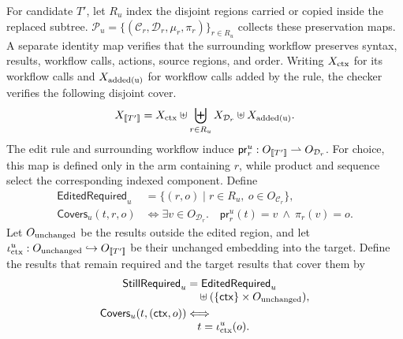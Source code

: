 For candidate \(T'\), let \(R_u\) index the disjoint regions carried or copied inside the replaced subtree.
\(\mathcal P_u=\{(\mathcal C_r,\mathcal D_r,\mu_r,\pi_r)\}_{r\in R_u}\) collects these preservation maps.
A separate identity map verifies that the surrounding workflow preserves syntax, results, workflow calls, actions, source regions, and order.
Writing \(X_{\rm ctx}\) for its workflow calls and \(X_{\rm added(u)}\) for workflow calls added by the rule, the checker verifies the following disjoint cover.
\[
 X_{\mathopen{[\![}T'\mathclose{]\!]}}=X_{\rm ctx}\uplus
   \biguplus_{r\in R_u}X_{\mathcal D_r}\uplus X_{\rm added(u)} .
\]
The edit rule and surrounding workflow induce \(\mathsf{pr}^u_r:O_{\mathopen{[\![}T'\mathclose{]\!]}}\rightharpoonup O_{\mathcal D_r}\).
For choice, this map is defined only in the arm containing \(r\), while product and sequence select the corresponding indexed component.
Define
\[
\begin{aligned}
 \mathsf{EditedRequired}_u&=\{(r,o)\mid r\in R_u,\ o\in O_{\mathcal C_r}\},\\
 \mathsf{Covers}_u(t,r,o)&\Longleftrightarrow
   \exists v\in O_{\mathcal D_r}.\quad
   \mathsf{pr}^u_r(t)=v\ \land\ \pi_r(v)=o .
\end{aligned}
\]
Let \(O_{\rm unchanged}\) be the results outside the edited region, and let \(\iota^u_{\rm ctx}:O_{\rm unchanged}\hookrightarrow O_{\mathopen{[\![}T'\mathclose{]\!]}}\) be their unchanged embedding into the target.
Define the results that remain required and the target results that cover them by
\begin{equation}
\label{eq:target-required}
\begin{aligned}
 \mathsf{StillRequired}_u&=\mathsf{EditedRequired}_u\\[-3pt]
   &\quad\uplus(\{\mathsf{ctx}\}\times O_{\rm unchanged}),\\
 \mathsf{Covers}_u(t,(\mathsf{ctx},o))
   &\Longleftrightarrow\\[-3pt]
   &\quad t=\iota^u_{\rm ctx}(o).
\end{aligned}
\end{equation}
